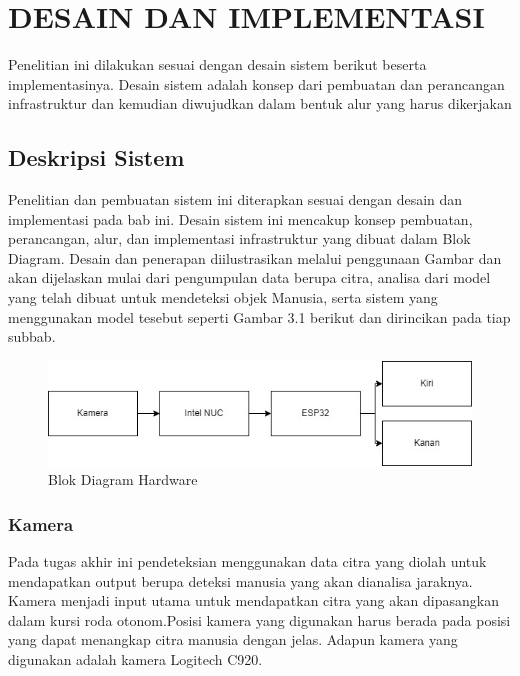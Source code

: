 \chapter{DESAIN DAN IMPLEMENTASI}
\label{chap:desainimplementasi}

Penelitian ini dilakukan sesuai dengan desain sistem berikut beserta implementasinya. Desain sistem adalah konsep dari pembuatan dan perancangan infrastruktur dan kemudian diwujudkan dalam bentuk alur yang harus dikerjakan 
\section{Deskripsi Sistem}
\label{sec:deskripsisistem}
Penelitian dan pembuatan sistem ini diterapkan sesuai dengan desain dan implementasi pada bab ini. Desain sistem ini mencakup konsep pembuatan, perancangan, alur, dan implementasi infrastruktur yang dibuat dalam Blok Diagram. Desain dan penerapan diilustrasikan melalui penggunaan Gambar dan akan dijelaskan mulai dari pengumpulan data berupa citra, analisa dari model yang telah dibuat untuk mendeteksi objek Manusia, serta sistem yang menggunakan model tesebut seperti Gambar 3.1 berikut dan dirincikan pada tiap subbab.

\begin{figure}[H]
  \centering

  \includegraphics[scale=0.6]{gambar/hardware.jpg}

  \caption{Blok Diagram Hardware}
  \label{fig:roketluarangkasa}
\end{figure}
\subsection{Kamera}
Pada tugas akhir ini pendeteksian menggunakan data citra yang diolah untuk mendapatkan output berupa deteksi manusia yang akan dianalisa jaraknya. Kamera menjadi input utama untuk mendapatkan citra yang akan dipasangkan dalam kursi roda otonom.Posisi kamera yang digunakan harus berada pada posisi yang dapat menangkap citra manusia dengan jelas. Adapun kamera yang digunakan adalah kamera Logitech C920. 

